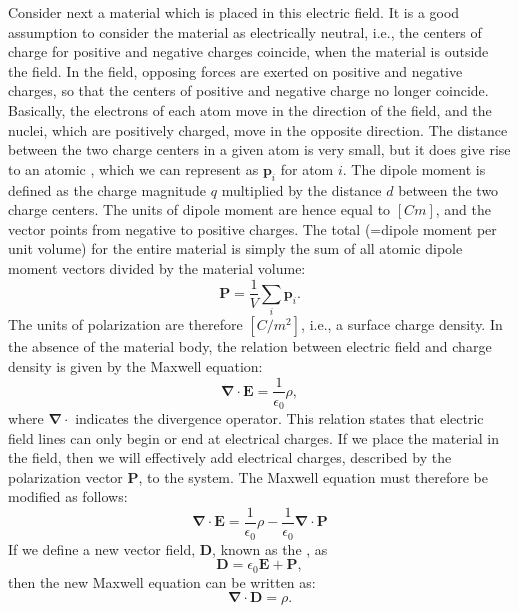 Consider next a material which is placed in this electric field.  It is a good assumption to consider the material as electrically neutral, i.e., the centers of charge for positive and negative charges coincide, when the material is outside the field.  In the field, opposing forces are exerted on positive and negative charges, so that the centers of positive and negative charge no longer coincide.  Basically, the electrons of each atom move in the direction of the field, and the nuclei, which are positively charged, move in the opposite direction.  The distance between the two charge centers in a given atom is very small, but it does give rise to an atomic , which we can represent as $\mathbf{p}_i$ for atom $i$.  The dipole moment  is defined as the charge magnitude $q$ multiplied by the distance $d$ between the two charge centers.  The units of dipole moment are hence equal to $[Cm]$, and the vector points from negative to positive charges.  The total  (=dipole moment per unit volume) for the entire material is simply the sum of all atomic dipole moment vectors divided by the material volume:
\begin{equation}
	\mathbf{P} = \frac{1}{V}\sum_i \mathbf{p}_i.
\end{equation}
The units of polarization are therefore $[C/m^2]$, i.e., a surface charge density. In the absence of the material body, the relation between electric field and charge density is given by the Maxwell equation:
\begin{equation}
	\bm{\nabla}\cdot\mathbf{E} = \frac{1}{\epsilon_0}\rho,
\end{equation}
where $\bm{\nabla}\cdot$ indicates the divergence operator.  This relation states that electric field lines can only begin or end at electrical charges.  If we place the material in the field, then we will effectively add electrical charges, described by the polarization vector $\mathbf{P}$, to the system.  The Maxwell equation must therefore be modified as follows:
\begin{equation}
	\bm{\nabla}\cdot\mathbf{E} = \frac{1}{\epsilon_0}\rho - \frac{1}{\epsilon_0}\bm{\nabla}\cdot\mathbf{P}
\end{equation}
If we define a new vector field, $\mathbf{D}$, known as the , as
\begin{equation}
	\mathbf{D} = \epsilon_0\mathbf{E}+\mathbf{P},
\end{equation}
then the new Maxwell equation can be written as:
\begin{equation}
	\bm{\nabla}\cdot\mathbf{D} = \rho.
\end{equation}

